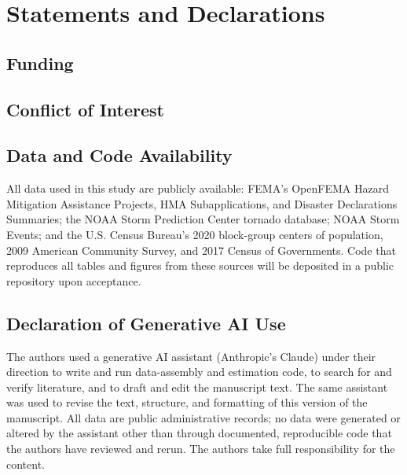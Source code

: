 \section*{Statements and Declarations}

\subsection*{Funding}

\subsection*{Conflict of Interest}

\subsection*{Data and Code Availability}
All data used in this study are publicly available: FEMA's OpenFEMA Hazard Mitigation Assistance Projects, HMA Subapplications, and Disaster Declarations Summaries; the NOAA Storm Prediction Center tornado database; NOAA Storm Events; and the U.S. Census Bureau's 2020 block-group centers of population, 2009 American Community Survey, and 2017 Census of Governments. Code that reproduces all tables and figures from these sources will be deposited in a public repository upon acceptance. 

\subsection*{Declaration of Generative AI Use}
The authors used a generative AI assistant (Anthropic's Claude) under their direction to write and run data-assembly and estimation code, to search for and verify literature, and to draft and edit the manuscript text. The same assistant was used to revise the text, structure, and formatting of this version of the manuscript. All data are public administrative records; no data were generated or altered by the assistant other than through documented, reproducible code that the authors have reviewed and rerun. The authors take full responsibility for the content.

